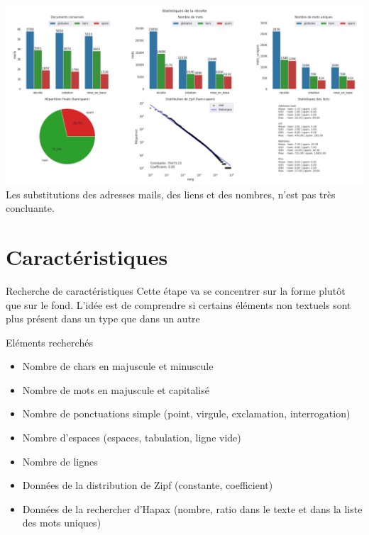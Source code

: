 \documentclass[xelatex,11pt, xcolor=dvipsnames]{beamer}
\begin{document}
\begin{frame}
	\includegraphics[width=\linewidth]{img/fouilleStats}
	Les substitutions des adresses mails, des liens et des nombres, n'est pas très concluante.
\end{frame}


\section{Caractéristiques}
\begin{frame}{Recherche de caractéristiques}
	Cette étape va se concentrer sur la forme plutôt que sur le fond.
	L'idée est de comprendre si certains éléments non textuels sont plus présent dans un type que dans un autre
	\begin{block}{Eléments recherchés}
		\begin{itemize}
			\item Nombre de chars en majuscule et minuscule
			\item Nombre de mots en majuscule et capitalisé
			\item Nombre de ponctuations simple (point, virgule, exclamation, interrogation)
			\item Nombre d'espaces (espaces, tabulation, ligne vide)
			\item Nombre de lignes
			\item Données de la distribution de Zipf (constante, coefficient)
			\item Données de la rechercher d'Hapax (nombre, ratio dans le texte et dans la liste des mots uniques)
		\end{itemize}
	\end{block}
\end{frame}
\end{document}
